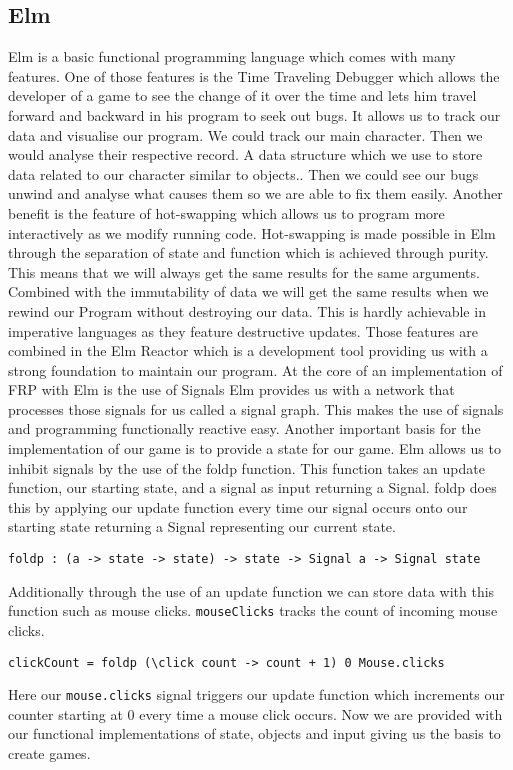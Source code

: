 \documentclass[pdftex,a4paper]{extarticle}
\begin{document}
\subsection{Elm}
Elm is a basic functional programming language which comes with many features.
One of those features is the Time Traveling Debugger\cite{elm-debugger} which allows the developer of a game to see the change of it over the time and lets him travel forward and backward in his program to seek out bugs.
It allows us to track our data and visualise our program.
We could track our main character. Then we would analyse their respective record\cite{elm-record}. A data structure which we use to store data related to our character similar to objects..
Then we could see our bugs unwind and analyse what causes them so we are able to fix them easily.
Another benefit is the feature of hot-swapping\cite{elm-swapping} which allows us to program more interactively as we modify running code.
Hot-swapping is made possible in Elm through the separation of state and function which is achieved through purity.
This means that we will always get the same results for the same arguments.
Combined with the immutability of data we will get the same results when we rewind our Program without destroying our data.
This is hardly achievable in imperative languages as they feature destructive updates.
Those features are combined in the Elm Reactor\cite{elm-reactor} which is a development tool providing us with a strong foundation to maintain our program.
At the core of an implementation of FRP with Elm is the use of Signals\cite{elm-signal}
Elm provides us with a network that processes those signals for us called a signal graph.
This makes the use of signals and programming functionally reactive easy.
Another important basis for the implementation of our game is to provide a state for our game.
Elm allows us to inhibit signals by the use of the foldp\cite{elm-signal} function.
This function takes an update function, our starting state, and a signal as input returning a Signal.
foldp does this by applying our update function every time our signal occurs onto our starting state returning a Signal representing our current state.
\newline
\begin{verbatim}
foldp : (a -> state -> state) -> state -> Signal a -> Signal state
\end{verbatim}
Additionally through the use of an update function we can store data with this function such as mouse clicks.
{\tt mouseClicks} tracks the count of incoming mouse clicks.
\newline
\begin{verbatim}
clickCount = foldp (\click count -> count + 1) 0 Mouse.clicks
\end{verbatim}
Here our {\tt mouse.clicks} signal triggers our update function which increments our counter starting at 0 every time a mouse click occurs.
Now we are provided with our functional implementations of state, objects and input giving us the basis to create games.
\end{document}
